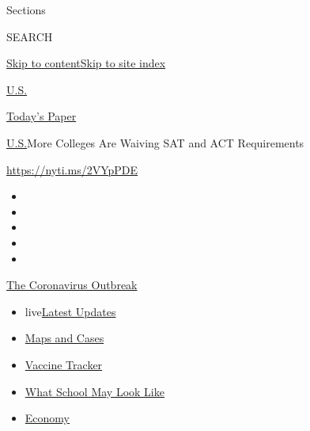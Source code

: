 Sections

SEARCH

\protect\hyperlink{site-content}{Skip to
content}\protect\hyperlink{site-index}{Skip to site index}

\href{https://www.nytimes.com/section/us}{U.S.}

\href{https://myaccount.nytimes.com/auth/login?response_type=cookie\&client_id=vi}{}

\href{https://www.nytimes.com/section/todayspaper}{Today's Paper}

\href{/section/us}{U.S.}\textbar{}More Colleges Are Waiving SAT and ACT
Requirements

\url{https://nyti.ms/2VYpPDE}

\begin{itemize}
\item
\item
\item
\item
\item
\end{itemize}

\href{https://www.nytimes.com/news-event/coronavirus?action=click\&pgtype=Article\&state=default\&region=TOP_BANNER\&context=storylines_menu}{The
Coronavirus Outbreak}

\begin{itemize}
\tightlist
\item
  live\href{https://www.nytimes.com/2020/08/02/world/coronavirus-updates.html?action=click\&pgtype=Article\&state=default\&region=TOP_BANNER\&context=storylines_menu}{Latest
  Updates}
\item
  \href{https://www.nytimes.com/interactive/2020/us/coronavirus-us-cases.html?action=click\&pgtype=Article\&state=default\&region=TOP_BANNER\&context=storylines_menu}{Maps
  and Cases}
\item
  \href{https://www.nytimes.com/interactive/2020/science/coronavirus-vaccine-tracker.html?action=click\&pgtype=Article\&state=default\&region=TOP_BANNER\&context=storylines_menu}{Vaccine
  Tracker}
\item
  \href{https://www.nytimes.com/interactive/2020/07/29/us/schools-reopening-coronavirus.html?action=click\&pgtype=Article\&state=default\&region=TOP_BANNER\&context=storylines_menu}{What
  School May Look Like}
\item
  \href{https://www.nytimes.com/live/2020/07/31/business/stock-market-today-coronavirus?action=click\&pgtype=Article\&state=default\&region=TOP_BANNER\&context=storylines_menu}{Economy}
\end{itemize}

